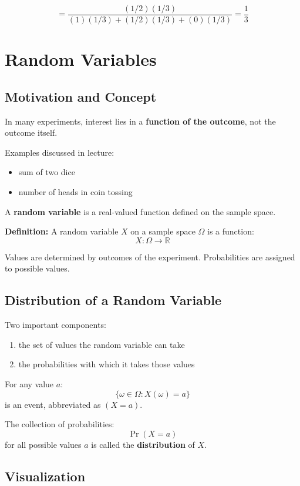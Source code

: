\documentclass[11pt]{article}
\begin{document}
\[
= \frac{(1/2)(1/3)}
{(1)(1/3) + (1/2)(1/3) + (0)(1/3)}
= \frac{1}{3}
\]

\section{Random Variables}

\subsection{Motivation and Concept}

In many experiments, interest lies in a \textbf{function of the outcome}, not the outcome itself.

Examples discussed in lecture:
\begin{itemize}[leftmargin=1.5em]
    \item sum of two dice
    \item number of heads in coin tossing
\end{itemize}

A \textbf{random variable} is a real-valued function defined on the sample space.

\textbf{Definition:}  
A random variable $X$ on a sample space $\Omega$ is a function:
\[
X : \Omega \rightarrow \mathbb{R}
\]

Values are determined by outcomes of the experiment.  
Probabilities are assigned to possible values.

\subsection{Distribution of a Random Variable}

Two important components:
\begin{enumerate}[leftmargin=1.5em]
    \item the set of values the random variable can take
    \item the probabilities with which it takes those values
\end{enumerate}

For any value $a$:
\[
\{ \omega \in \Omega : X(\omega) = a \}
\]
is an event, abbreviated as $(X = a)$.

The collection of probabilities:
\[
\Pr(X = a)
\]
for all possible values $a$ is called the \textbf{distribution} of $X$.

\subsection{Visualization}
\end{document}
